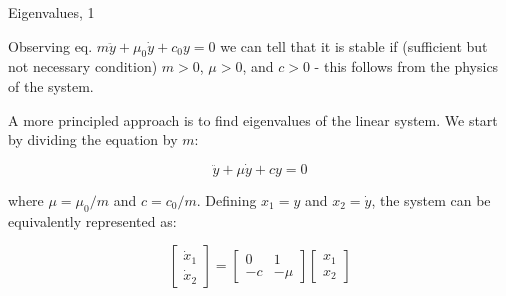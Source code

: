 \documentclass{beamer}
\begin{document}
\begin{frame}{Eigenvalues, 1}
	\begin{flushleft}
		
		Observing eq. $m \ddot y + \mu_0 \dot y + c_0 y = 0$ we can tell that it is stable if (sufficient but not necessary condition) $m > 0$, $\mu > 0$, and $c > 0$ - this follows from the physics of the system.
		
		\bigskip
		
		A more principled approach is to find eigenvalues of the linear system. We start by dividing the equation by $m$:
		
		\begin{equation}
			\ddot y + \mu \dot y + c y = 0
		\end{equation}
		
		where $\mu = \mu_0 / m$ and $c = c_0 / m$. Defining $x_1 = y$ and $x_2 = \dot y$, the system can be equivalently represented as:
		
		\begin{equation}
			\begin{bmatrix}
				\dot x_1 \\ \dot x_2
			\end{bmatrix}
			=
			\begin{bmatrix}
				0 & 1 \\
				-c & -\mu
			\end{bmatrix} 
			\begin{bmatrix}
				x_1 \\ x_2
			\end{bmatrix}   
		\end{equation}
		
		
	\end{flushleft}
\end{frame}
\end{document}
